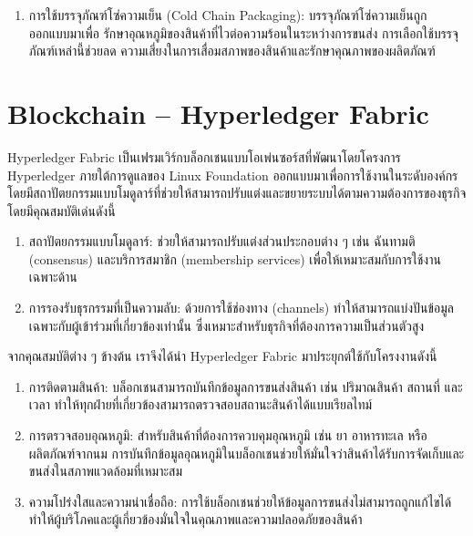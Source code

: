 \begin{enumerate}
        \begin{itemize}
            \item ความแข็งแรงและทนทาน : เพื่อป้องกันความเสียหายจากแรงกระแทกหรือการกดทับระหว่างการขนส่ง
            \item การป้องกันการรั่วซึม : เพื่อป้องกันการปนเปื้อนจากน้ำ สารเคมี หรือสิ่งสกปรก
            \item ขนาดที่เหมาะสม : เพื่อให้สินค้าเหมาะกับบรรจุภัณฑ์ ไม่แน่นหรือหลวมเกินไป
            \item วัสดุที่ได้รับมาตรฐาน Food Grade : เพื่อความปลอดภัยของผู้บริโภค
        \end{itemize}
    \item การใช้บรรจุภัณฑ์โซ่ความเย็น (Cold Chain Packaging): บรรจุภัณฑ์โซ่ความเย็นถูกออกแบบมาเพื่อ	รักษาอุณหภูมิของสินค้าที่ไวต่อความร้อนในระหว่างการขนส่ง การเลือกใช้บรรจุภัณฑ์เหล่านี้ช่วยลด	ความเสี่ยงในการเสื่อมสภาพของสินค้าและรักษาคุณภาพของผลิตภัณฑ์ 
\end{enumerate}

\section{Blockchain – Hyperledger Fabric }
Hyperledger Fabric เป็นเฟรมเวิร์กบล็อกเชนแบบโอเพ่นซอร์สที่พัฒนาโดยโครงการ Hyperledger ภายใต้การดูแลของ Linux Foundation ออกแบบมาเพื่อการใช้งานในระดับองค์กร  
โดยมีสถาปัตยกรรมแบบโมดูลาร์ที่ช่วยให้สามารถปรับแต่งและขยายระบบได้ตามความต้องการของธุรกิจ 
โดยมีคุณสมบัติเด่นดังนี้ 

\begin{enumerate}
    \item สถาปัตยกรรมแบบโมดูลาร์: ช่วยให้สามารถปรับแต่งส่วนประกอบต่าง ๆ เช่น ฉันทามติ (consensus) และบริการสมาชิก (membership services) เพื่อให้เหมาะสมกับการใช้งานเฉพาะด้าน
    \item การรองรับธุรกรรมที่เป็นความลับ: ด้วยการใช้ช่องทาง (channels) ทำให้สามารถแบ่งปันข้อมูลเฉพาะกับผู้เข้าร่วมที่เกี่ยวข้องเท่านั้น ซึ่งเหมาะสำหรับธุรกิจที่ต้องการความเป็นส่วนตัวสูง 
\end{enumerate}
จากคุณสมบัติต่าง ๆ ข้างต้น เราจึงได้นำ Hyperledger Fabric มาประยุกต์ใช้กับโครงงานดังนี้ 
\begin{enumerate}
    \item การติดตามสินค้า: บล็อกเชนสามารถบันทึกข้อมูลการขนส่งสินค้า เช่น ปริมาณสินค้า สถานที่ และเวลา ทำให้ทุกฝ่ายที่เกี่ยวข้องสามารถตรวจสอบสถานะสินค้าได้แบบเรียลไทม์ 
    \item การตรวจสอบอุณหภูมิ: สำหรับสินค้าที่ต้องการควบคุมอุณหภูมิ เช่น ยา อาหารทะเล หรือผลิตภัณฑ์จากนม การบันทึกข้อมูลอุณหภูมิในบล็อกเชนช่วยให้มั่นใจว่าสินค้าได้รับการจัดเก็บและขนส่งในสภาพแวดล้อมที่เหมาะสม 
    \item ความโปร่งใสและความน่าเชื่อถือ: การใช้บล็อกเชนช่วยให้ข้อมูลการขนส่งไม่สามารถถูกแก้ไขได้ ทำให้ผู้บริโภคและผู้เกี่ยวข้องมั่นใจในคุณภาพและความปลอดภัยของสินค้า
\end{enumerate}

